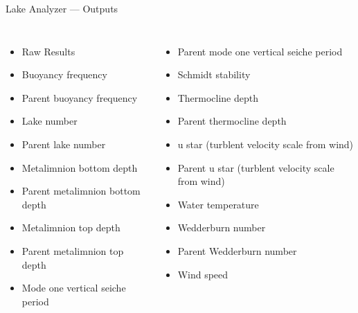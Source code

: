 \documentclass[xcolor=svgnames,professionalfonts,11pt,aspectratio=43,handout]{beamer}
\begin{document}
\begin{frame}{Lake Analyzer --- Outputs}
  \begin{columns}
    \begin{itemize}
      \item Raw Results
      \item Buoyancy frequency
      \item Parent buoyancy frequency
      \item Lake number
      \item Parent lake number
      \item Metalimnion bottom depth
      \item Parent metalimnion bottom depth
      \item Metalimnion top depth
      \item Parent metalimnion top depth
      \item Mode one vertical seiche period
    \end{itemize}
    \begin{itemize}
      \item Parent mode one vertical seiche period
      \item Schmidt stability
      \item Thermocline depth
      \item Parent thermocline depth
      \item u star (turblent velocity scale from wind)
      \item Parent u star (turblent velocity scale from wind)
      \item Water temperature
      \item Wedderburn number
      \item Parent Wedderburn number
      \item Wind speed
    \end{itemize}
  \end{columns}
\end{frame}
\end{document}
